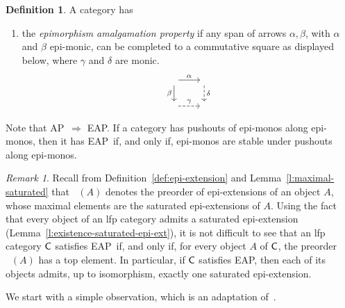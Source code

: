 \documentclass[a4paper,10pt,reqno]{amsart}
\theoremstyle{definition}
\newtheorem{definition}[theorem]{Definition}
\theoremstyle{remark}
\newtheorem{remark}[theorem]{Remark}
\newcommand{\cat}{{\sf C}}								%
\DeclareMathOperator{\EExt}{Ext_{p}}					%
\newcommand{\IMP}{\Rightarrow}						%
\newcommand{\AP}{\textnormal{AP}}
\newcommand{\EAP}{\textnormal{EAP}}
\begin{document}
\begin{definition}\label{d:EAP}
A category has
\begin{enumerate}
\item[(\EAP)]\label{EAP} the \emph{epimorphism amalgamation property} if any span of arrows $\alpha,\beta$, with $\alpha$ and $\beta$ epi-monic, can be completed to a commutative square as displayed below, where $\gamma$ and $\delta$ are monic.
\[\begin{tikzcd}[cells={nodes={inner sep=2pt, outer sep=1pt}}]
\phantom{\cdot} \arrow{r}{\alpha} \arrow{d}[swap]{\beta} & \phantom{\cdot} \arrow[dashed]{d}{\delta} \\
\phantom{\cdot} \arrow[dashed]{r}{\gamma} & \phantom{\cdot}
\end{tikzcd}\]
\end{enumerate}
\end{definition}
%
Note that \AP~$\IMP$ \EAP. If a category has pushouts of epi-monos along epi-monos, then it has \EAP~if, and only if, epi-monos are stable under pushouts along epi-monos.

\begin{remark}\label{rmk:EAP-unique-saturated-epi-ext}
Recall from Definition~\ref{def:epi-extension} and Lemma~\ref{l:maximal-saturated} that $\EExt(A)$ denotes the preorder of epi-extensions of an object $A$, whose maximal elements are the saturated epi-extensions of $A$. Using the fact that every object of an lfp category admits a saturated epi-extension (Lemma~\ref{l:existence-saturated-epi-ext}), it is not difficult to see that an lfp category $\cat$ satisfies \EAP~if, and only if, for every object $A$ of $\cat$, the preorder $\EExt(A)$ has a top element. In particular, if $\cat$ satisfies \EAP, then each of its objects admits, up to isomorphism, exactly one saturated epi-extension.
\end{remark}

We start with a simple observation, which is an adaptation of~\cite[Lemma~1]{Ringel1971}.
\end{document}
